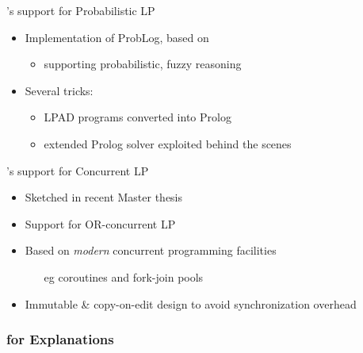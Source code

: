 \documentclass[presentation]{beamer}\mode<presentation>{\usetheme{AMSBolognaFC}}
\begin{document}
\begin{frame}{\twopkt{}'s support for Probabilistic LP}
    \vfill

    \begin{itemize}\small
        \item Implementation of \alert{ProbLog}, based on \twopkt{}
        \begin{itemize}
            \item supporting \alert{probabilistic}, fuzzy reasoning
        \end{itemize}
        \vfill
        \item Several tricks:
        \begin{itemize}
            \item LPAD programs \alert{converted} into Prolog
            \item extended Prolog solver exploited behind the scenes
        \end{itemize}
    \end{itemize}
\end{frame}

\begin{frame}{\twopkt{}'s support for Concurrent LP}
    \begin{itemize}

        \item Sketched in recent Master thesis

        \vfill

        \item Support for \alert{OR-concurrent} LP
        
        \vfill

        \item Based on \emph{modern} \alert{concurrent programming} facilities 
        \begin{itemize}
            \item[eg] coroutines and fork-join pools
        \end{itemize}

        \vfill

        \item Immutable \& \alert{copy-on-edit} design to avoid synchronization overhead
    \end{itemize}
\end{frame}

\subsubsection{\twopkt{} for Explanations}
\end{document}
